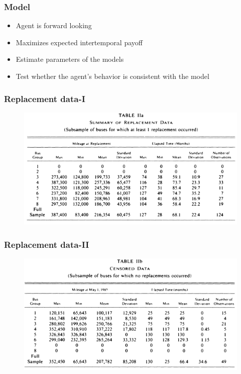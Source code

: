\documentclass{beamer}
\begin{document}
\begin{frame}
\frametitle{Model }
\begin{itemize}
\item Agent is forward looking
\bigskip
\item Maximizes expected intertemporal payoff
\bigskip
\item Estimate parameters of the models 
\bigskip
\item Test whether the agent's behavior is consistent with the model
\end{itemize}
\end{frame}


\begin{frame}
\frametitle{Replacement data-I}
\begin{center}
\begin{figure}[h!]
\includegraphics[scale =0.5]{replacement_data1.png}
\end{figure}
\end{center}
\end{frame}

\begin{frame}
\frametitle{Replacement data-II}
\begin{center}
\begin{figure}[h!]
\includegraphics[scale =0.5]{replacement_data2.png}
\end{figure}
\end{center}
\end{frame}
\end{document}
